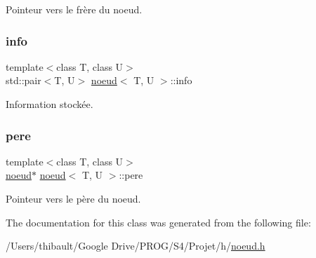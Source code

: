 Pointeur vers le frère du noeud. 

\mbox{\label{classnoeud_ad6e70a2d7350a11040d53468eaa40510}} 
\subsubsection{\texorpdfstring{info}{info}}
{\footnotesize\ttfamily template$<$class T, class U$>$ \\
std\+::pair$<$T, U$>$ \hyperlink{classnoeud}{noeud}$<$ T, U $>$\+::info}



Information stockée. 

\mbox{\label{classnoeud_ab00690971a24c6013c5484aeb23eecbf}} 
\subsubsection{\texorpdfstring{pere}{pere}}
{\footnotesize\ttfamily template$<$class T, class U$>$ \\
\hyperlink{classnoeud}{noeud}$\ast$ \hyperlink{classnoeud}{noeud}$<$ T, U $>$\+::pere}



Pointeur vers le père du noeud. 



The documentation for this class was generated from the following file\+:\begin{DoxyCompactItemize}
\item 
/\+Users/thibault/\+Google Drive/\+P\+R\+O\+G/\+S4/\+Projet/h/\hyperlink{noeud_8h}{noeud.\+h}\end{DoxyCompactItemize}
